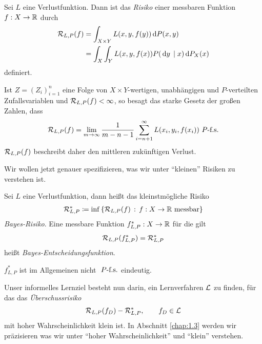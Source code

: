\begin{defn}
\label{defn:1.2.2}
Sei $L$ eine Verlustfunktion. Dann ist das \emph{Risiko} einer messbaren
Funktion $f: X\to\mathbb{R}$ durch
\begin{align*}
\mathcal{R}_{L,P}(f) &= \int_{X\times Y} L(x,y,f(y))\,\mathrm{d} P(x,y)\\
&= \int_X \int_Y L(x,y,f(x))P(\,\mathrm{d} y\,\mid x)\,\mathrm{d} P_X(x)
\end{align*}
definiert.\fishhere
\end{defn}
\begin{bem*}[Interpretation.]
Ist $Z=(Z_i)_{i=1}^n$ eine Folge von $X\times Y$-wertigen, unabhängigen und
$P$-verteilten Zufallsvariablen und $\mathcal{R}_{L,P}(f) < \infty$, so besagt das
starke Gesetz der großen Zahlen, dass
\begin{align*}
\mathcal{R}_{L,P}(f) = \lim\limits_{m\to\infty} \frac{1}{m-n-1}\sum_{i=n+1}^\infty
L(x_i,y_i,f(x_i))\ P\text{-f.s.}
\end{align*}
$\mathcal{R}_{L,P}(f)$ beschreibt daher den mittleren zukünftigen Verlust.\maphere
\end{bem*}

Wir wollen jetzt genauer spezifizieren, was wir unter ``kleinen'' Risiken
zu verstehen ist.
\begin{defn}
\label{defn:1.2.3}
Sei $L$ eine Verlustfunktion, dann heißt das kleinstmögliche Risiko
\begin{align*}
\mathcal{R}_{L,P}^* \coloneq \inf\left\{ \mathcal{R}_{L,P}(f)\,:\,f:X\to\mathbb{R}\text{ messbar}\right\}
\end{align*}
\emph{Bayes-Risiko}.
Eine messbare Funktion $f_{L,P}^* : X \to \mathbb{R}$ für die gilt
\begin{align*}
\mathcal{R}_{L,P}(f_{L,P}^*) = \mathcal{R}_{L,P}^*
\end{align*}
heißt
\emph{Bayes-Entscheidungsfunktion}.\fishhere
\end{defn}

$f_{L,P}^*$ ist im Allgemeinen nicht $\ P\text{-f.s.}$ eindeutig.

Unser informelles Lernziel besteht nun darin, ein Lernverfahren $\mathcal{L}$ zu
finden, für das das \emph{Überschussrisiko}
\begin{align*}
\mathcal{R}_{L,P}(f_D) - \mathcal{R}_{L,P}^*,\qquad f_D\in\mathcal{L}
\end{align*}
mit hoher Wahrscheinlichkeit klein ist. In Abschnitt \ref{chap:1.3} werden wir
präzisieren was wir unter ``hoher Wahrscheinlichkeit'' und ``klein''
verstehen.

